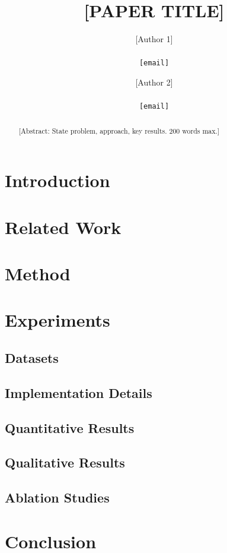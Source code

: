 \documentclass[10pt,twocolumn,letterpaper]{article}
\title{[PAPER TITLE]}
\author{[Author 1] \\ [Affiliation] \\ {\tt\small [email]}
\and [Author 2] \\ [Affiliation] \\ {\tt\small [email]}}
\begin{document}
\maketitle

\begin{abstract}
[Abstract: State problem, approach, key results. 200 words max.]
\end{abstract}

\section{Introduction}

\section{Related Work}

\section{Method}

\section{Experiments}

\subsection{Datasets}

\subsection{Implementation Details}

\subsection{Quantitative Results}

\subsection{Qualitative Results}

\subsection{Ablation Studies}

\section{Conclusion}

{\small


}
\end{document}
